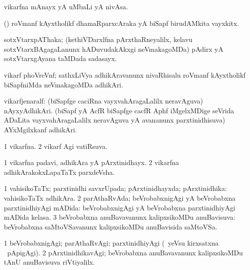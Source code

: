\bentry
{} 
\gl{\nA}
\expl{}
\bmng
 vikarfna mAnayx yA uMbaLi yA nivAsa. 
\emng
\eentry

\bentry
{}
\gl{\nA}
\expl{}
\bmng
 (\roVkAyx) roVmanf kAyxtholikf dhamaRparxcAraka yA biSapf birudAMkita vayxkitx. 
\emng
\eentry

\bentry
{}
\gl{\nA}
\expl{}
\bmng
 sotxVtarxpAThaka; (kethiVDarxlfna pArxthaRneyalilx, kelavu sotxVtarxBAgagaLanunx hADuvudakAkxgi neVmakagoMDa) pAdirx yA sotxVtarxgAyana taMDada sadasayx. 
\emng
\eentry

\bentry
{} 
\gl{\nA}
\expl{}
\bmng
 vikarf phoVreVnf; sathxLiVya adhikAravanunx nivaRhisalu roVmanf kAyxtholikf biSapfniMda neVmakagoMDa adhikAri. 
\emng
\eentry

\bentry
{} 
\gl{\nA}
\bmng
 vikarfjenaralf: 
\banum
{} (\roVkAyx biSapfge caciRna vayxvahAragaLalilx neravAguva) nAyxyAdhikAri. 
 (biSapf yA AcfR biSapfge cacfR Aphf iMgelxMDige seVrida ADaLita vayxvahAragaLalilx neravAguva yA avananunx parxtinidhisuva) AYxMgilxkanf adhikAri. 
\eanum
\emng
\eentry

\bentry
{} 
\gl{\gu}
\expl{}
\bmng
\bnum
\num{1} vikarfna. 
\num{2} vikarf Agi vatiRsuva. 
\enum
\emng
\eentry

\bentry
{} 
\gl{\nA}
\expl{}
\bmng
\bnum
\num{1} vikarfna padavi, adhikAra yA pArxtinidhayx. 
\num{2} vikarfna adhikArakokxLapaTaTx parxdeVsha. 
\enum
\emng
\eentry

\bentry
{} 
\gl{\gu}
\expl{}
\bmng
\bnum
\num{1} vahisikoTaTx; parxtinidhi savxrUpada; pArxtinidhayxda; pArxtinidhika:  vahisikoTaTx adhikAra. 
\num{2} parAthaRvAda; beVrobabxnigAgi yA beVrobabxna parxtinidhiyAgi mADida:  beVrobabxnigAgi yA beVrobabxna parxtinidhiyAgi mADida kelasa. 
\num{3} beVrobabxna anuBavavanunx kalipxsikoMDu anuBavisuva:  beVrobabxna saMtoVSavanunx kalipxsikoMDu anuBavisida saMtoVSa. 
\enum
\emng
\eentry

\bentry
{} 
\gl{\kirxvi}
\expl{}
\bmng
\bnum
\num{1} beVrobabxnigAgi; parAthaRvAgi; parxtinidhiyAgi (\kanmu\ yeVsu kirxsatxna \vi\ pApigAgi). 
\num{2} pArxtinidhikavAgi; beVrobabxna anuBavavanunx kalipxsikoMDu tAnU anuBavisuva riVtiyalilx. 
\enum
\emng
\eentry

